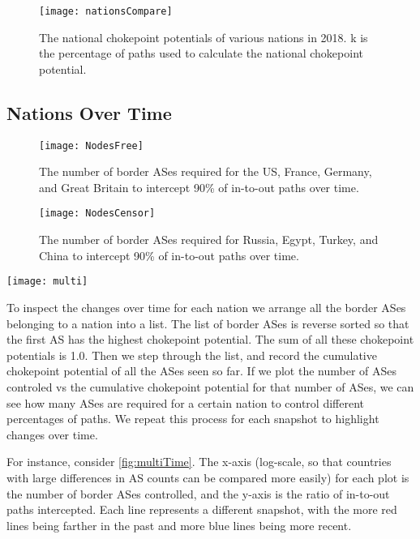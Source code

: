 \begin{figure}[ht]
	\centering
	\texttt{[image: nationsCompare]}
	\caption{The national chokepoint potentials of various nations in 2018. k is the
	percentage of paths used to calculate the national chokepoint potential.}\label{fig:nationsCompare}
\end{figure}

\subsection{Nations Over Time}

\begin{figure}
	\centering
	\texttt{[image: NodesFree]}
	\caption{The number of border ASes required for the US, France, Germany, and Great Britain to intercept 90\% of in-to-out paths over time.}\label{fig:nodesFree}
\end{figure}
\begin{figure}
	\centering
	\texttt{[image: NodesCensor]}
	\caption{The number of border ASes required for Russia, Egypt, Turkey, and China to intercept 90\% of in-to-out paths over time.}\label{fig:nodesCensor}
\end{figure}
\begin{figure*}
	\centering
	\texttt{[image: multi]}
	\caption{The capability for various nations to intercept in-to-out paths over multiple years \timerange. Each plot shows for a number of border ASes controlled (x-axis),
	what fraction of in-to-out paths are intercepted (y-axis). Years in blue are more recent, and years in red are further in the past.}\label{fig:multiTime}
\end{figure*}

To inspect the changes over time for each nation we arrange all the border ASes
belonging to a nation into a list. The list of border ASes is reverse sorted so
that the first AS has the highest chokepoint potential. The sum of all these
chokepoint potentials is 1.0. Then we step through the list, and record the
cumulative chokepoint potential of all the ASes seen so far. If we plot the
number of ASes controled vs the cumulative chokepoint potential for that number
of ASes, we can see how many ASes are required for a certain nation to control
different percentages of paths. We repeat this process for each snapshot to
highlight changes over time.

For instance, consider \figurename \ref{fig:multiTime}.  The x-axis (log-scale,
so that countries with large differences in AS counts can be compared more
easily) for each plot is the number of border ASes controlled, and the y-axis
is the ratio of in-to-out paths intercepted. Each line represents a different
snapshot, with the more red lines being farther in the past and more blue lines
being more recent.


